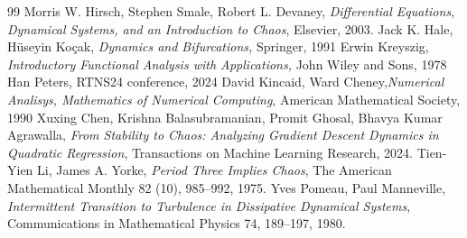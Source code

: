 \documentclass[12pt,a4paper]{report}
\theoremstyle{definition}
\begin{document}
\begin{thebibliography}{99}
     Morris W. Hirsch, Stephen Smale, Robert L. Devaney, {\em Differential Equations, Dynamical Systems, and an Introduction to Chaos}, Elsevier, 2003.
     Jack K. Hale, Hüseyin Koçak, {\em Dynamics and Bifurcations,}  Springer, 1991
     Erwin Kreyszig, {\em Introductory Functional Analysis with Applications,} John Wiley and Sons, 1978
     Han Peters, RTNS24 conference, 2024
     David Kincaid, Ward Cheney,{\em Numerical Analisys, Mathematics of Numerical Computing}, American Mathematical Society, 1990
     Xuxing Chen, Krishna Balasubramanian, Promit Ghosal, Bhavya Kumar Agrawalla, {\em From Stability to Chaos: Analyzing Gradient Descent Dynamics in Quadratic Regression}, Transactions on Machine Learning Research, 2024.
     Tien-Yien Li, James A. Yorke, {\em Period Three Implies Chaos}, The American Mathematical Monthly 82 (10), 985--992, 1975.
     Yves Pomeau, Paul Manneville, {\em Intermittent Transition to Turbulence in Dissipative Dynamical Systems}, Communications in Mathematical Physics 74, 189--197, 1980.
\end{thebibliography}
\end{document}
